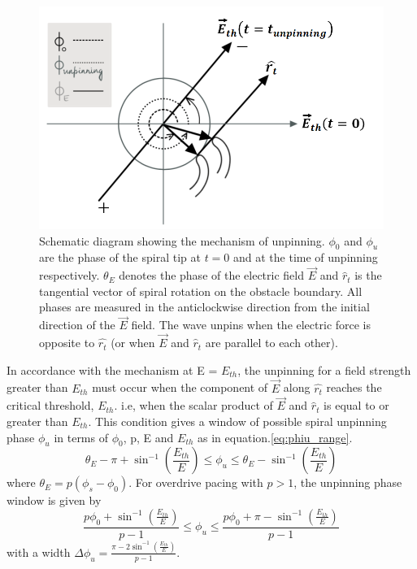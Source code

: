 \documentclass[%
 preprint,
 amsmath,amssymb,
 aps,
]{revtex4-2}
\begin{document}
\begin{figure}[H]
    \centering
    \includegraphics[width=0.8\linewidth]{cpef_theory.png}
    \caption{Schematic diagram showing the mechanism of unpinning. $\phi_{0}$ and  $\phi_{u}$ are the phase of the spiral tip at $t=0$ and at the time of unpinning respectively. $\theta_{E}$ denotes the phase of the electric field ${\vec{E}}$ and ${\hat{r}}_{t}$ is the tangential vector of spiral rotation on the obstacle boundary. All phases are measured in the anticlockwise direction from the initial direction of the $\vec{E}$ field. The wave unpins when the electric force is opposite to $\hat{r_t}$ (or when ${\vec{E}}$ and ${\hat{r}}_{t}$ are parallel to each other).
    }
    
    \label{fig:acw_theory}
\end{figure}


In accordance with the mechanism at E = $E_{th}$, the unpinning for a field strength greater than $E_{th}$ must occur when the component of $\vec{E}$ along $\hat{r_t}$ reaches the critical threshold, $E_{th}$. i.e, when the scalar product of ${\vec{E}}$ and ${\hat{r}}_{t}$ is equal to or greater than $E_{th}$. This condition gives a window of possible spiral unpinning phase $\phi_{u}$ in terms of $\phi_{0}$, p, E and $E_{th}$ as in equation.\ref{eq:phiu_range}.
\begin{equation}
\theta_{E} - \pi + {\sin^{-1}} (\frac{E_{th}}{E})  \leq \phi_u \leq \theta_{E}-{\sin^{-1}} (\frac{E_{th}}{E}) 
\label{eq:phiu_range}
\end{equation}
where $\theta_{E}=p(\phi_s-\phi_0)$. 
For overdrive pacing with $p>1$, the unpinning phase window is given by
\begin{equation}
\frac{p \phi_0+ {\sin^{-1}}(\frac{E_{th}}{E})}{p-1}   \leq \phi_u \leq \frac{p \phi_0+\pi -{\sin^{-1}}(\frac{E_{th}}{E})}{p-1}
\label{eq:overdrive}
\end{equation}
with a width $\Delta\phi_u = \frac{\pi - 2 \sin^{-1}(\frac{E_{th}}{E})}{p-1}$.
\end{document}
